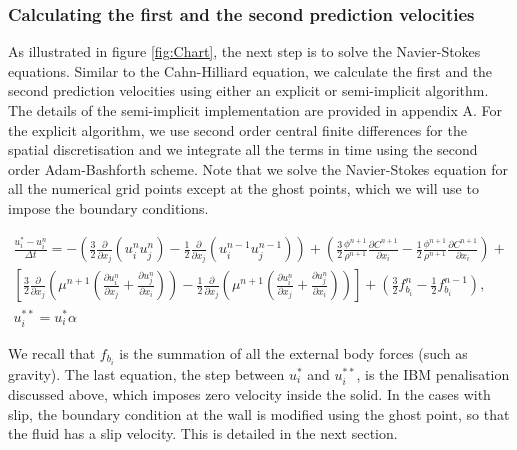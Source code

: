 \documentclass[review]{elsarticle}
\begin{document}
\subsubsection{Calculating the first and the second prediction velocities}
As illustrated in figure \ref{fig:Chart}, the next step is to solve the Navier-Stokes equations. Similar to the Cahn-Hilliard equation, we calculate the first and the second prediction velocities using either an explicit or semi-implicit algorithm. The details of the semi-implicit implementation are provided in appendix A. For the explicit algorithm, we use second order central finite differences for the spatial discretisation and we integrate all the terms in time using the second order Adam-Bashforth scheme. Note that we solve the Navier-Stokes equation for all the numerical grid points except at the ghost points, which  we will use to impose the boundary conditions.
\begin{linenomath}\begin{equation} \label{PredictionExp}  
\begin{gathered}
\frac{u^*_i-u^n_i}{\Delta t} = -\left( \frac{3}{2} \frac{\partial}{\partial x_j}(u^n_i u^{n}_j)-\frac{1}{2} \frac{\partial}{\partial x_j}(u^{n-1}_i u^{n-1}_j) \right)+
\left(  \frac{3}{2} \frac{\phi^{n+1}}{\rho^{n+1}}\frac{\partial C^{n+1} }{\partial x_i}- \frac{1}{2} \frac{\phi^{n+1}}{\rho^{n+1}}\frac{\partial C^{n+1} }{\partial x_i}    \right)+\\
\left[  \frac{3}{2}  \frac{\partial}{\partial x_j} \left(\mu^{n+1}(\frac{\partial u^n_i}{\partial x_j}+\frac{\partial u^n_j}{\partial x_i})\right) -\frac{1}{2}  \frac{\partial}{\partial x_j} \left(\mu^{n+1}(\frac{\partial u^n_i}{\partial x_j}+\frac{\partial u^n_j}{\partial x_i})\right)  \right]+
\left( \frac{3}{2}  f^n_{b_i}-\frac{1}{2}  f^{n-1}_{b_i} \right),\\
u^{**}_i = u^{*}_i \alpha
\end{gathered}
\end{equation}\end{linenomath}
We recall that  $f_{b_i}$ is the summation of all the external body forces (such as gravity). The last equation, the step between $u_i^*$ and $u_i^{**}$, is the
IBM penalisation discussed above, which imposes zero velocity inside the solid. In the cases with slip, the boundary condition at the wall is modified using the ghost point, so that the fluid has a slip velocity. This is detailed in the next section.  
\end{document}
